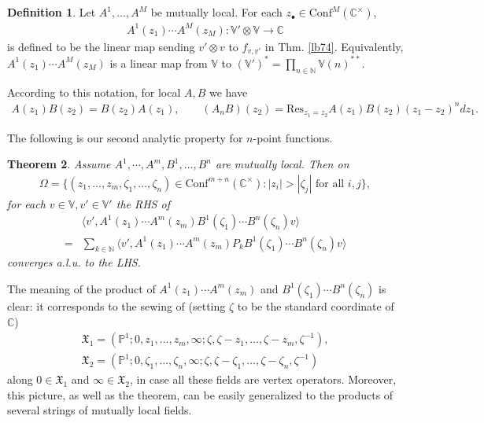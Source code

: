 \documentclass[11pt,b5paper,notitlepage]{article}
\theoremstyle{definition}
\newtheorem{df}{Definition}[section]
\theoremstyle{plain}
\newtheorem{thm}[df]{Theorem}
\newcommand{\fk}{\mathfrak}
\newcommand{\Conf}{\mathrm{Conf}}
\newcommand{\Res}{\mathrm{Res}}
\newcommand{\bk}[1]{\langle {#1}\rangle}
\newcommand{\blt}{\bullet}
\newcommand{\Vbb}{\mathbb V}
\newcommand{\Cbb}{\mathbb C}
\newcommand{\Nbb}{\mathbb N}
\newcommand{\Pbb}{\mathbb P}
\numberwithin{equation}{section}
\begin{document}
\subsection{}
\begin{df}\label{lb75}
	Let $A^1,\dots,A^M$ be mutually local. For each $z_\blt\in\Conf^M(\Cbb^\times)$,
	\begin{align}
		A^1(z_1)\cdots A^M(z_M):\Vbb'\otimes\Vbb\rightarrow\Cbb	
	\end{align}
is defined to be the linear map sending $v'\otimes v$ to $f_{v,v'}$ in Thm. \ref{lb74}. Equivalently, $A^1(z_1)\cdots A^M(z_M)$ is a linear map from $\Vbb$ to $(\Vbb')^*=\prod_{n\in\Nbb}\Vbb(n)^{**}$.
\end{df}
According to this notation, for local $A,B$ we have
\begin{align}
	A(z_1)B(z_2)=B(z_2)A(z_1),\qquad (A_nB)(z_2)=\Res_{z_1=z_2}A(z_1)B(z_2)(z_1-z_2)^ndz_1.
\end{align}


The following is our second analytic property for $n$-point functions.

\begin{thm}\label{lb77}
Assume $A^1,\cdots,A^m,B^1,\dots,B^n$ are mutually local. Then on
\begin{align*}
\Omega=\{(z_1,\dots,z_m,\zeta_1,\dots,\zeta_n)\in\Conf^{m+n}(\Cbb^\times):|z_i|>|\zeta_j|\text{ for all }i,j\},
\end{align*}
for each $v\in\Vbb,v'\in\Vbb'$ the RHS of
\begin{align}
&\bk{v',A^1(z_1)\cdots A^m(z_m)B^1(\zeta_1)\cdots B^n(\zeta_n)v}\nonumber\\
=&\sum_{k\in\Nbb}	\bk{v',A^1(z_1)\cdots A^m(z_m)P_kB^1(\zeta_1)\cdots B^n(\zeta_n)v}\label{eq122}
\end{align}
converges a.l.u. to the LHS.
\end{thm}



The meaning of the product of $A^1(z_1)\cdots A^m(z_m)$ and $B^1(\zeta_1)\cdots B^n(\zeta_n)$ is clear: it corresponds to the sewing of (setting $\zeta$ to be the standard coordinate of $\Cbb$)
\begin{gather*}
\fk X_1=(\Pbb^1;0,z_1,\dots,z_m,\infty;\zeta,\zeta-z_1,\dots,\zeta-z_m,\zeta^{-1}),\\
\fk X_2=(\Pbb^1;0,\zeta_1,\dots,\zeta_n,\infty;\zeta,\zeta-\zeta_1,\dots,\zeta-\zeta_n,\zeta^{-1})	
\end{gather*}
along $0\in\fk X_1$ and $\infty\in\fk X_2$, in case all these fields are vertex operators.  Moreover, this picture, as well as the theorem, can be easily generalized to the products of several strings of mutually local fields.
\end{document}
